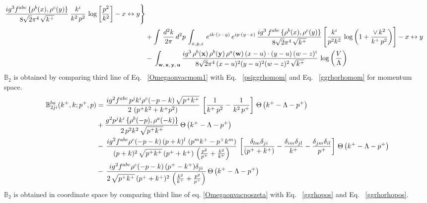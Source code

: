 \documentclass[aps,prd,amsmath,amssymb,nofootinbib]{revtex4-2}
\def\mf#1{\mathbb{#1}}
\numberwithin{equation}{section}
\begin{document}
\begin{align}
\frac{ig^{3}f^{abc}\,\{\rho^{b}(x),\rho^{c}(y)\}}{8\sqrt{2}\pi^{4}\, \sqrt{k^{+}}}\, \frac{k^{i}}{k^{2}\,p^{2}}\, \log{\left[\frac{p^{2}}{k^{2}}\right]}-x\leftrightarrow y \Bigg\}\notag \\ & +  \int\, \frac{d^{2}k}{2\pi}\, d^{2}p\, \int_{x,y,z}\,e^{ik\cdot (z-y)}\, e^{ip\cdot (y-x)}\, \frac{ig^{3}\,f^{abc}\,\{\rho^{b}(x),\rho^{c}(y)\}}{8\sqrt{2}\pi^{4}\,\sqrt{k^{+}}}\, \Bigg[\frac{k^{i}}{p^{2}k^{2}}\,\log{\left(1+\frac{\vee\, k^{2}}{k^{+}\, p^{2}}\right)}\Bigg]-x\leftrightarrow y \notag \\ & -\,\int_{\mathbf{w},\, \mathbf{x},\, \mathbf{y},\, \mathbf{u}}\frac{ig^{3}\,\rho^{b}(\mathbf{x})\,\rho^{b}(\mathbf{y})\,\rho^{a}(\mathbf{w})\, (x-u)\cdot (y-u)\,(w-z)^{i}}{8\sqrt{2}\pi^{4}\,(x-u)^{2}(y-u)^{2}(w-z)^{2}\,\sqrt{k^{+}}}\,\log{\left(\frac{V}{\Lambda}\right)}
\end{align}
$\mf{B}_{2}$ is obtained by comparing third line of Eq.~ \eqref{Omegaonvacmom1} with Eq.~ \eqref{psiggrhomom} and Eq.~ \eqref{ggrhorhomom} for momentum space.
\begin{align}
    \mf{B}^{ba}_{2ji}(k^{+},k;p^{+},p) & =  \frac{ig^{2}f^{abc}\,p^{j}k^{i}\rho^{c}(-p-k)\, \sqrt{p^{+}k^{+}}}{2\,\left(p^{+}k^{2}+k^{+}p^{2}\right)}\,\left[\frac{1}{k^{+}\,p^{2}} - \frac{1}{k^{2}\,p^{+}}\right]\,\Theta\left(k^{+}-\Lambda-p^{+}\right)\notag \\ & + \frac{g^{2}p^{j}k^{i}\,\{\rho^{b}(-p),\rho^{a}(-k)\}}{2\,p^{2}k^{2}\, \sqrt{p^{+}k^{+}}}\,\Theta\left(k^{+}-\Lambda-p^{+}\right)\notag \\ & -\,\frac{ig^{2}f^{abc}\rho^{c}(-p-k)\,(p+k)^{l}\,\left(p^{m}k^{+}-p^{+}k^{m}\right)}{(p+k)^{2}\,\sqrt{p^{+}k^{+}}\,(p^{+}+k^{+})\,\left(\frac{p^{2}}{p^{+}}+\frac{k^{2}}{k^{+}}\right)}\,\left[\frac{\delta_{lm}\delta_{ji}}{(p^{+}+k^{+})} - \frac{\delta_{im}\delta_{jl}}{k^{+}} - \frac{\delta_{jm}\delta_{il}}{p^{+}}\right]\,\Theta\left(k^{+}-\Lambda-p^{+}\right)\notag \\ & -\,\frac{ig^{2}f^{abc}\rho^{c}(-p-k)\,(p^{+}-k^{+})\delta_{ji}}{2\,\sqrt{p^{+}k^{+}}\,(p^{+}+k^{+})^{2}\,\left(\frac{k^{2}}{k^{+}}+\frac{p^{2}}{p^{+}}\right)}\,\Theta\left(k^{+}-\Lambda-p^{+}\right)
\end{align}
$\mf{B}_{2}$ is obtained in coordinate space by comparing third line of eq. \eqref{Omegaonvacposzeta} with Eq.~ \eqref{ggrhopos} and Eq.~ \eqref{ggrhorhopos}.
\end{document}
